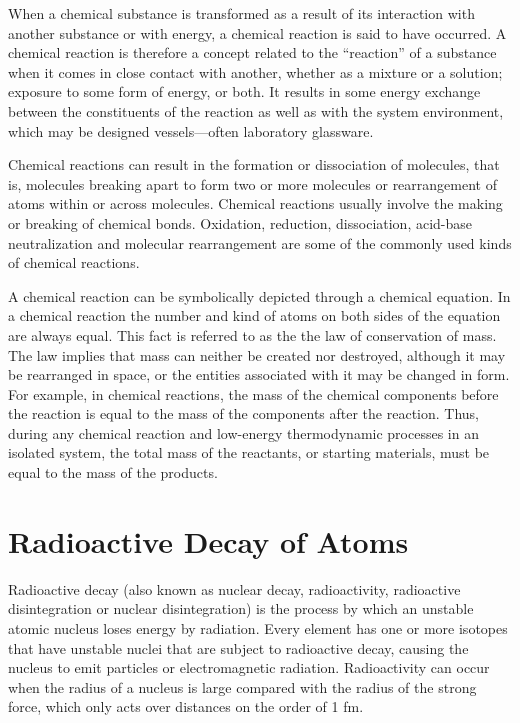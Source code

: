 \documentclass[
]{book}
\begin{document}
When a chemical substance is transformed as a result of its interaction with another substance or with energy, a chemical reaction is said to have occurred. A chemical reaction is therefore a concept related to the ``reaction'' of a substance when it comes in close contact with another, whether as a mixture or a solution; exposure to some form of energy, or both. It results in some energy exchange between the constituents of the reaction as well as with the system environment, which may be designed vessels---often laboratory glassware.

Chemical reactions can result in the formation or dissociation of molecules, that is, molecules breaking apart to form two or more molecules or rearrangement of atoms within or across molecules. Chemical reactions usually involve the making or breaking of chemical bonds. Oxidation, reduction, dissociation, acid-base neutralization and molecular rearrangement are some of the commonly used kinds of chemical reactions.

A chemical reaction can be symbolically depicted through a chemical equation. In a chemical reaction the number and kind of atoms on both sides of the equation are always equal. This fact is referred to as the the law of conservation of mass. The law implies that mass can neither be created nor destroyed, although it may be rearranged in space, or the entities associated with it may be changed in form. For example, in chemical reactions, the mass of the chemical components before the reaction is equal to the mass of the components after the reaction. Thus, during any chemical reaction and low-energy thermodynamic processes in an isolated system, the total mass of the reactants, or starting materials, must be equal to the mass of the products.

\hypertarget{radioactive-decay-of-atoms}{%
\section{Radioactive Decay of Atoms}\label{radioactive-decay-of-atoms}}

Radioactive decay (also known as nuclear decay, radioactivity, radioactive disintegration or nuclear disintegration) is the process by which an unstable atomic nucleus loses energy by radiation. Every element has one or more isotopes that have unstable nuclei that are subject to radioactive decay, causing the nucleus to emit particles or electromagnetic radiation. Radioactivity can occur when the radius of a nucleus is large compared with the radius of the strong force, which only acts over distances on the order of 1 fm.
\end{document}
